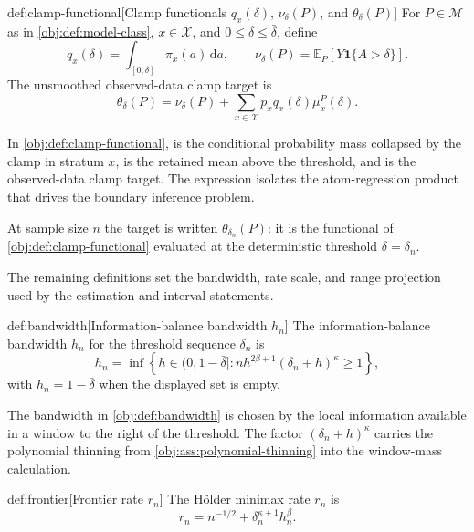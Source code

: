 \begin{definitionv}{def:clamp-functional}[Clamp functionals \(q_x(\delta)\), \(\nu_\delta(P)\), and \(\theta_\delta(P)\)]
For \(P\in\mathcal M\) as in \cref{obj:def:model-class}, \(x\in\mathcal X\), and \(0\leq\delta\leq\bar\delta\), define
\[
q_x(\delta)=\int_{[0,\delta]}\pi_x(a)\,\mathrm da,
\qquad
\nu_\delta(P)=\mathbb E_P\!\left[Y\mathbf 1\{A>\delta\}\right].
\]
The unsmoothed observed-data clamp target is
\[
\theta_\delta(P)
=
\nu_\delta(P)
+
\sum_{x\in\mathcal X}p_xq_x(\delta)\mu_x^P(\delta).
\]
\end{definitionv}

In \cref{obj:def:clamp-functional},  is the conditional probability mass collapsed by the clamp in stratum \(x\),  is the retained mean above the threshold, and  is the observed-data clamp target. The expression isolates the atom-regression product that drives the boundary inference problem.

At sample size \(n\) the target is written \(\theta_{\delta_n}(P)\): it is the functional of \cref{obj:def:clamp-functional} evaluated at the deterministic threshold \(\delta=\delta_n\).

The remaining definitions set the bandwidth, rate scale, and range projection used by the estimation and interval statements.

\begin{definitionv}{def:bandwidth}[Information-balance bandwidth \(h_n\)]
The information-balance bandwidth \(h_n\) for the threshold sequence \(\delta_n\) is
\[
h_n
=
\inf\left\{
h\in(0,1-\bar\delta]:
n h^{2\beta+1}(\delta_n+h)^\kappa\geq 1
\right\},
\]
with \(h_n=1-\bar\delta\) when the displayed set is empty.
\end{definitionv}

The bandwidth  in \cref{obj:def:bandwidth} is chosen by the local information available in a window to the right of the threshold. The factor \((\delta_n+h)^\kappa\) carries the polynomial thinning from \cref{obj:ass:polynomial-thinning} into the window-mass calculation.

\begin{definitionv}{def:frontier}[Frontier rate \(r_n\)]
The Hölder minimax rate \(r_n\) is
\[
r_n=n^{-1/2}+\delta_n^{\kappa+1}h_n^\beta .
\]
\end{definitionv}


